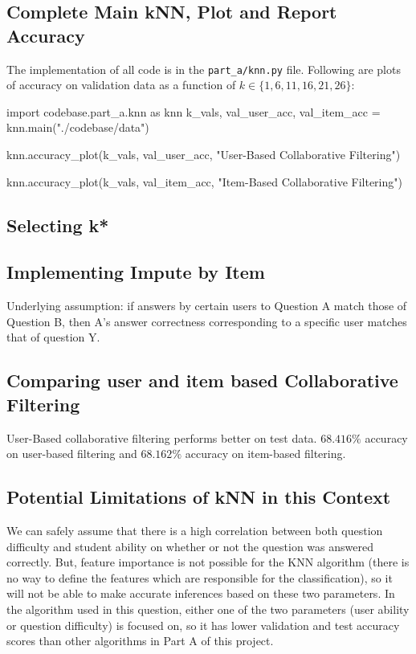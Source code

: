 \documentclass{article}
\begin{document}
    \subsection{Complete Main kNN, Plot and Report Accuracy}
    The implementation of all code is in the \verb|part_a/knn.py| file. Following are plots of accuracy on validation data as a function of $k \in \{1,6,11,16,21,26\}$:

    \begin{pylabblock}
        import codebase.part_a.knn as knn
        k_vals, val_user_acc, val_item_acc = knn.main("./codebase/data")
    \end{pylabblock}

    \begin{pylabblock}
        knn.accuracy_plot(k_vals, val_user_acc, "User-Based Collaborative Filtering")
    \end{pylabblock}

    \begin{pylabblock}
        knn.accuracy_plot(k_vals, val_item_acc, "Item-Based Collaborative Filtering")
    \end{pylabblock}

    


    \subsection{Selecting k*}
    
    \subsection{Implementing Impute by Item}
    Underlying assumption: if answers by certain users to Question A match those of Question B, then A’s answer correctness corresponding to a specific user matches that of question Y. 

    \subsection{Comparing user and item based Collaborative Filtering}
    User-Based collaborative filtering performs better on test data. $68.416\%$ accuracy on user-based filtering and $68.162\%$ accuracy on item-based filtering.

    \subsection{Potential Limitations of kNN in this Context}
    We can safely assume that there is a high correlation between both question difficulty and student ability on whether or not the question was answered correctly. But, feature importance is not possible for the KNN algorithm (there is no way to define the features which are responsible for the classification), so it will not be able to make accurate inferences based on these two parameters. In the algorithm used in this question, either one of the two parameters (user ability or question difficulty) is focused on, so it has lower validation and test accuracy scores than other algorithms in Part A of this project. 
\end{document}
